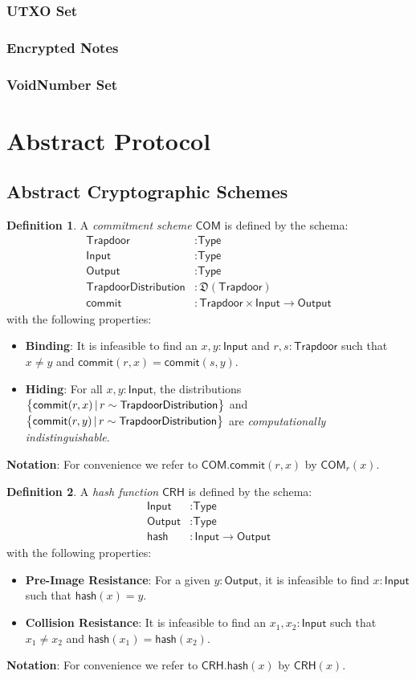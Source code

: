 \documentclass[a4paper]{article}
\newcommand{\lsection}[2]{\def\sectionlabel{#2} \section{#1}\label{sec:#2}}
\newcommand{\lsubsubsection}[2]{\def\sectionlabel{#2} \subsubsection{#1}\label{sec:#2}}
\theoremstyle{definition}
\newtheorem{definition}{Definition}[subsection]
\newcommand{\COM}{{\textsf{COM}}}
\newcommand{\CRH}{{\textsf{CRH}}}
\newcommand{\Input}{{\textsf{Input}}}
\newcommand{\Output}{{\textsf{Output}}}
\newcommand{\TrapdoorDistribution}{{\textsf{TrapdoorDistribution}}}
\newcommand{\Trapdoor}{{\textsf{Trapdoor}}}
\newcommand{\Type}{{\textsf{Type}}}
\newcommand{\UTXO}{{\textsf{UTXO}}}
\newcommand{\VoidNumber}{{\textsf{VoidNumber}}}
\newcommand{\commit}{{\textsf{commit}}}
\newcommand{\hash}{{\textsf{hash}}}
\begin{document}
\lsubsubsection{\UTXO{} Set}{ledger-utxo-set}

\lsubsubsection{Encrypted Notes}{ledger-encrypted-notes}

\lsubsubsection{\VoidNumber{} Set}{ledger-void-number-set}

\lsection{Abstract Protocol}{abstract-protocol}

\subsection{Abstract Cryptographic Schemes}

\begin{definition}
    A \emph{commitment scheme} $\COM$ is defined by the schema:
    \begin{align*}
        \Trapdoor             &: \Type \\
        \Input                &: \Type \\
        \Output               &: \Type \\
        \TrapdoorDistribution &: \mathfrak{D}(\Trapdoor) \\
        \commit               &: \Trapdoor \times \Input \to \Output
    \end{align*}
    with the following properties:

    \begin{itemize}
        \item \textbf{Binding}: It is infeasible to find an $x, y : \Input$ and $r, s: \Trapdoor$ such that $x \ne y$ and $\commit(r,x) = \commit(s,y)$.
        \item \textbf{Hiding}: For all $x, y : \Input$, the distributions $\set{\commit(r,x) \,|\, r \sim \TrapdoorDistribution}$ and \\ $\set{\commit(r,y) \,|\, r \sim \TrapdoorDistribution}$ are \emph{computationally indistinguishable}.
    \end{itemize}

\textbf{Notation}: For convenience we refer to $\COM.\commit(r,x)$ by $\COM_r(x)$.
\end{definition}

\begin{definition}
A \emph{hash function} $\CRH$ is defined by the schema:
\begin{align*}
    \Input  &: \Type \\
    \Output &: \Type \\
    \hash   &: \Input \to \Output
\end{align*}
with the following properties:

\begin{itemize}
    \item \textbf{Pre-Image Resistance}: For a given $y : \Output$, it is infeasible to find $x : \Input$ such that $\hash(x) = y$.
    \item \textbf{Collision Resistance}: It is infeasible to find an $x_1, x_2 : \Input$ such that $x_1 \ne x_2$ and $\hash(x_1) = \hash(x_2)$.
\end{itemize}

\textbf{Notation}: For convenience we refer to $\CRH.\hash(x)$ by $\CRH(x)$.
\end{definition}
\end{document}
